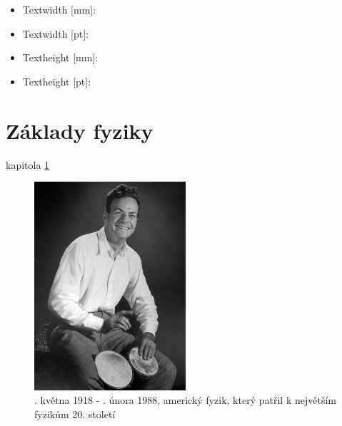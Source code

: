 





\graphicspath{{../src/FYZ/img/}}

\begin{itemize}
  \item Textwidth [mm]:      \printlength{\textwidth}
  \item Textwidth [pt]:      \printlength{\textwidth}
  \item Textheight [mm]:     \printlength{\textheight}
  \item Textheight [pt]:     \printlength{\textheight}
\end{itemize}

\chapter{Základy fyziky}\label{fyz:IchapI}

kapitola \ref{fyz:IchapI}

\begin{figure}[ht!]  %
  \centering
  \includegraphics[width=0.5\textwidth]{fyz_fig067.jpg}
  \caption{. května 1918 - . února 1988, 
           americký fyzik, který patřil k největším fyzikům 20. století}
  \label{fyz:fig067}
\end{figure} 


